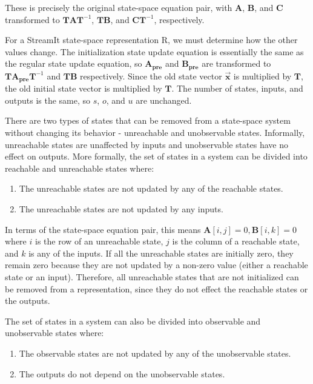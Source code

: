     These is precisely the original state-space equation pair,
with $\mathbf{A}$, $\mathbf{B}$, and $\mathbf{C}$ transformed to
$\mathbf{T} \mathbf{A} \mathbf{T}^{-1}$, $\mathbf{T} \mathbf{B}$,
and $\mathbf{C} \mathbf{T}^{-1}$, respectively.

    For a StreamIt state-space representation $\mathrm{R}$, we must
determine how the other values change. The initialization state
update equation is essentially the same as the regular state
update equation, so $\mathbf{A_{pre}}$ and $\mathbf{B_{pre}}$ are
transformed to $\mathbf{T} \mathbf{A_{pre}} \mathbf{T}^{-1}$ and
$\mathbf{T} \mathbf{B}$ respectively. Since the old state vector
$\vec{\mathbf{x}}$ is multiplied by $\mathbf{T}$, the old initial
state vector is multiplied by $\mathbf{T}$. The number of states,
inputs, and outputs is the same, so $s$, $o$, and $u$ are
unchanged.


    There are two types of states that can be removed from a state-space system
without changing its behavior - unreachable and unobservable
states. Informally, unreachable states are unaffected by inputs
and unobservable states have no effect on outputs. More formally,
the set of states in a system can be divided into reachable and
unreachable states where:
\begin{enumerate}
\vspace{\itemshrink} \item The unreachable states are not updated by any of the
reachable states.

\vspace{\itemshrink} \item The unreachable states are not updated by any inputs.
\vspace{\itemshrink} \end{enumerate}

    In terms of the state-space equation pair, this means $\mathbf{A}[i,j] =
0, \mathbf{B}[i,k] = 0$ where $i$ is the row of an unreachable
state, $j$ is the column of a reachable state, and $k$ is any of
the inputs.
    If all the unreachable states are initially zero, they
remain zero because they are not updated by a non-zero value
(either a reachable state or an input). Therefore, all unreachable
states that are not initialized can be removed from a
representation, since they do not effect the reachable states or
the outputs.

    The set of states in a system can also be divided into
observable and unobservable states where:
\begin{enumerate}
\vspace{\itemshrink} \item The observable states are not updated by any of the
unobservable states.

\vspace{\itemshrink} \item The outputs do not depend on the unobservable states.
\vspace{\itemshrink} \end{enumerate}

